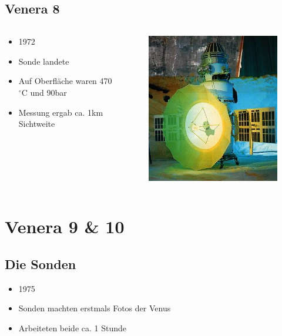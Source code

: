 \documentclass{beamer}
\begin{document}
	\subsection{Venera 8}
	\begin{frame}
		\begin{columns}
			\begin{column}{0.5\textwidth}
				\begin{itemize}
					\item 1972
					\item Sonde landete
					\item Auf Oberfläche waren 470$^\circ$C und 90bar
					\item Messung ergab ca. 1km Sichtweite
				\end{itemize}
			\end{column}
			\begin{column}{0.4\textwidth}
				\begin{figure}[ht]
					\includegraphics[scale=0.4]{./images/venera_8}
				\end{figure}
			\end{column}
		\end{columns}
	\end{frame}
	\section{Venera 9 \& 10}
	\subsection{Die Sonden}
	\begin{frame}
		\begin{itemize}
			\item 1975
			\item Sonden machten erstmals Fotos der Venus
			\item Arbeiteten beide ca. 1 Stunde
		\end{itemize}
	\end{frame}
\end{document}
